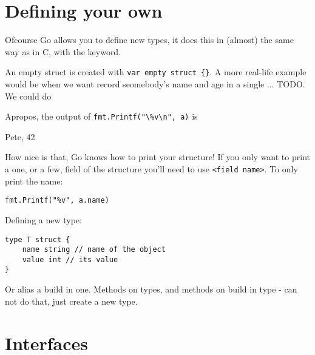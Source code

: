 \section{Defining your own}
\label{sec:defining your own}
Ofcourse Go allows you to define new types, it does this in (almost) the
same way as in C, with the  keyword.

An empty struct is created with \lstinline|var empty struct {}|{}.
A more real-life example would be when we want record seomebody's name
and age in a single ... TODO. We could do



Apropos, the output of \lstinline{fmt.Printf("\%v\n", a)} is 
\begin{display}
{Pete, 42}
\end{display}
How nice is that, Go knows how to print your structure! If you
only want to print a one, or a few, field of the structure you'll
need to use \verb|<field name>|. To only print the name:
\begin{lstlisting}
fmt.Printf("%v", a.name)
\end{lstlisting}

Defining a new type:

\begin{lstlisting}
type T struct {
    name string // name of the object
    value int // its value
}
\end{lstlisting}

Or alias a build in one.
Methods on types, and methods on build in type - can not do that,
just create a new type.

\section{Interfaces}

